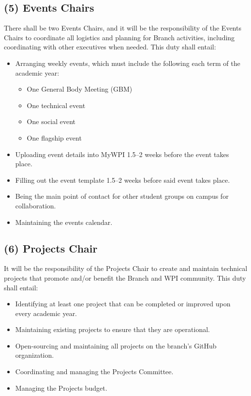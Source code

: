 \documentclass[11pt]{article}
\begin{document}
\subsection*{(5) Events Chairs}

There shall be two Events Chairs, and it will be the responsibility of the Events Chairs to coordinate all logistics and planning for Branch activities, including coordinating with other executives when needed. This duty shall entail:

\begin{itemize}
    \item Arranging weekly events, which must include the following each term of the academic year:
    \begin{itemize}
        \item One General Body Meeting (GBM)
        \item One technical event
        \item One social event
        \item One flagship event
    \end{itemize}
    \item Uploading event details into MyWPI 1.5--2 weeks before the event takes place.
    \item Filling out the event template 1.5--2 weeks before said event takes place.
    \item Being the main point of contact for other student groups on campus for collaboration.
    \item Maintaining the events calendar.
\end{itemize}

\subsection*{(6) Projects Chair}

It will be the responsibility of the Projects Chair to create and maintain technical projects that promote and/or benefit the Branch and WPI community. This duty shall entail:

\begin{itemize}
    \item Identifying at least one project that can be completed or improved upon every academic year.
    \item Maintaining existing projects to ensure that they are operational.
    \item Open-sourcing and maintaining all projects on the branch's GitHub organization.
    \item Coordinating and managing the Projects Committee.
    \item Managing the Projects budget.
\end{itemize}
\end{document}
